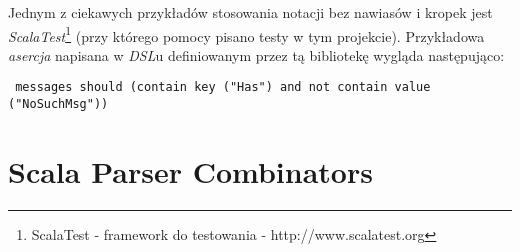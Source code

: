Jednym z ciekawych przykładów stosowania notacji bez nawiasów i kropek jest \textit{ScalaTest}\footnote{ScalaTest - framework do testowania - http://www.scalatest.org}
(przy którego pomocy pisano testy w tym projekcie). Przykładowa \textit{asercja} napisana w \textit{DSL}u definiowanym przez tą bibliotekę wygląda następująco:
\begin{lstlisting}
 messages should (contain key ("Has") and not contain value ("NoSuchMsg"))
\end{lstlisting}



\section{Scala Parser Combinators}
\label{sec:scala_parser_combinators}

